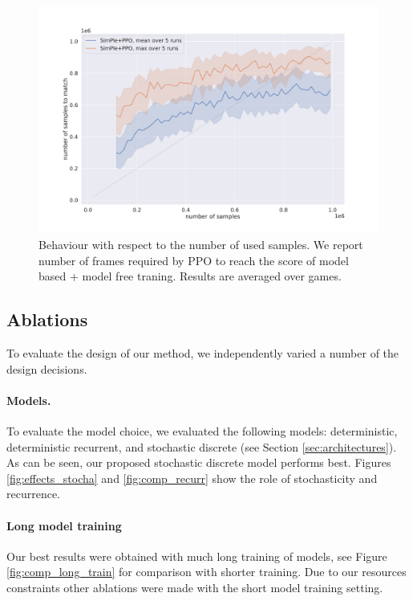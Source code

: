 \begin{figure}
	\includegraphics[width = \mywidth]{figures/number_of_step_simple_ppo.pdf}
	\caption{Behaviour with respect to the number of used samples. We report number of frames required by PPO to reach the score of model based + model free traning. Results are averaged over games.\label{fig:numberOfStepsSimplePPO}}
\end{figure}



\subsection{Ablations}\label{sec:ablations}

To evaluate the design of our method, we independently varied a number of the design decisions.

\paragraph{Models.} To evaluate the model choice, we evaluated the following models: deterministic, deterministic recurrent, and stochastic discrete (see Section \ref{sec:architectures}). As can be seen, our proposed stochastic discrete model performs best. Figures \ref{fig:effects_stocha} and \ref{fig:comp_recurr} show the role of stochasticity and recurrence. 

\paragraph{Long model training} Our best results were obtained with much long training of models, see Figure \ref{fig:comp_long_train} for comparison with shorter training. Due to our resources constraints other ablations were made with the short model training setting.

